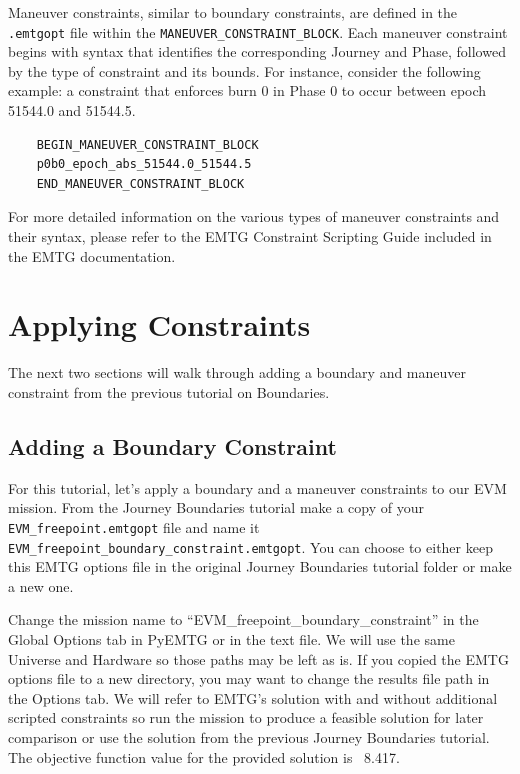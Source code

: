 \documentclass[11pt]{article}
\begin{document}
\noindent Maneuver constraints, similar to boundary constraints, are defined in the \verb|.emtgopt| file within the \verb|MANEUVER_CONSTRAINT_BLOCK|. Each maneuver constraint begins with syntax that identifies the corresponding Journey and Phase, followed by the type of constraint and its bounds. For instance, consider the following example: a constraint that enforces burn 0 in Phase 0 to occur between epoch 51544.0 and 51544.5.

\begin{verbatim}
    BEGIN_MANEUVER_CONSTRAINT_BLOCK
    p0b0_epoch_abs_51544.0_51544.5
    END_MANEUVER_CONSTRAINT_BLOCK
\end{verbatim}

\noindent For more detailed information on the various types of maneuver constraints and their syntax, please refer to the \ac{EMTG} Constraint Scripting Guide included in the \ac{EMTG} documentation.

\section{Applying Constraints}
\label{sec:applying_constraints}

The next two sections will walk through adding a boundary and maneuver constraint from the previous tutorial on Boundaries.

\subsection{Adding a Boundary Constraint}
\label{sec:adding_a_boundary_constraint}

For this tutorial, let's apply a boundary and a maneuver constraints to our EVM mission. From the Journey Boundaries tutorial make a copy of your \verb|EVM_freepoint.emtgopt| file and name it \verb|EVM_freepoint_boundary_constraint.emtgopt|. You can choose to either keep this \ac{EMTG} options file in the original Journey Boundaries tutorial folder or make a new one.

\noindent Change the mission name to ``EVM\_freepoint\_boundary\_constraint'' in the Global Options tab in PyEMTG or in the text file. We will use the same Universe and Hardware so those paths may be left as is. If you copied the \ac{EMTG} options file to a new directory, you may want to change the results file path in the Options tab. We will refer to \ac{EMTG}'s solution with and without additional scripted constraints so run the mission to produce a feasible solution for later comparison or use the solution from the previous Journey Boundaries tutorial. The objective function value for the provided solution is ~8.417.
\end{document}
